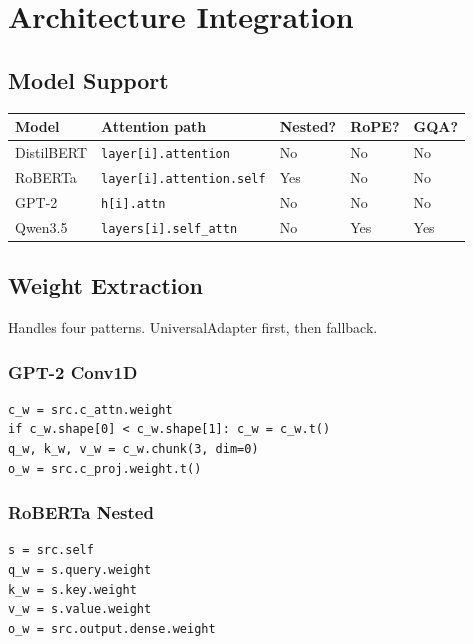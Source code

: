 \section{Architecture Integration}

\subsection{Model Support}

\begin{table}[H]
\centering
\small
\begin{tabular}{lllll}
\toprule
\textbf{Model} & \textbf{Attention path} & \textbf{Nested?} & \textbf{RoPE?} & \textbf{GQA?} \\
\midrule
DistilBERT & \texttt{layer[i].attention} & No & No & No \\
RoBERTa & \texttt{layer[i].attention.self} & Yes & No & No \\
GPT-2 & \texttt{h[i].attn} & No & No & No \\
Qwen3.5 & \texttt{layers[i].self\_attn} & No & Yes & Yes \\
\bottomrule
\end{tabular}
\end{table}

\subsection{Weight Extraction}

Handles four patterns. UniversalAdapter first, then fallback.

\subsubsection{GPT-2 Conv1D}

\begin{lstlisting}
c_w = src.c_attn.weight
if c_w.shape[0] < c_w.shape[1]: c_w = c_w.t()
q_w, k_w, v_w = c_w.chunk(3, dim=0)
o_w = src.c_proj.weight.t()
\end{lstlisting}

\subsubsection{RoBERTa Nested}

\begin{lstlisting}
s = src.self
q_w = s.query.weight
k_w = s.key.weight
v_w = s.value.weight
o_w = src.output.dense.weight
\end{lstlisting}

